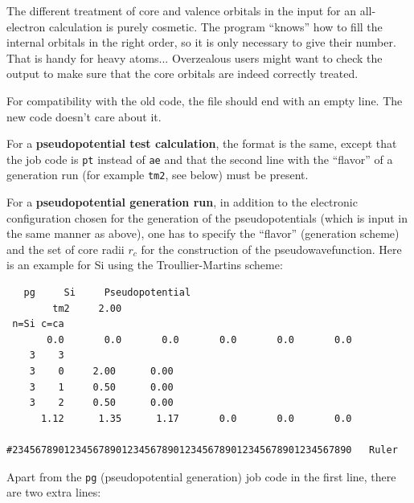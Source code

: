 \documentclass[11pt]{article}
\begin{document}
The different treatment of core and valence orbitals in the input for an
all-electron calculation is purely cosmetic. The program ``knows'' how
to fill the internal orbitals in the right order, so it is only
necessary to give their number. That is handy for heavy atoms...
Overzealous users might want to check the output to make sure that the
core orbitals are indeed correctly treated.

For compatibility with the old code, the file should end
with an empty line.  The new code doesn't care about it.

For a {\bf pseudopotential test calculation}, the format is
the same, except that the job code is {\tt pt} instead of {\tt ae}
and that the second line with the ``flavor'' of a generation run
(for example {\tt tm2}, see below) must be present.


For a {\bf pseudopotential generation run}, in addition to the
electronic configuration chosen for the generation of the
pseudopotentials (which is input in the same manner as above), one has
to specify the ``flavor'' (generation scheme) and the set of core
radii $r_c$ for the construction of the pseudowavefunction. Here is an
example for Si using the Troullier-Martins scheme:

\begin{verbatim}
   pg     Si     Pseudopotential
        tm2     2.00
 n=Si c=ca
       0.0       0.0       0.0       0.0       0.0       0.0
    3    3
    3    0     2.00      0.00
    3    1     0.50      0.00
    3    2     0.50      0.00
      1.12      1.35      1.17       0.0       0.0       0.0

#23456789012345678901234567890123456789012345678901234567890   Ruler
\end{verbatim}

Apart from the {\tt pg} (pseudopotential generation) job code in the
first line, there are two extra lines:
\end{document}
